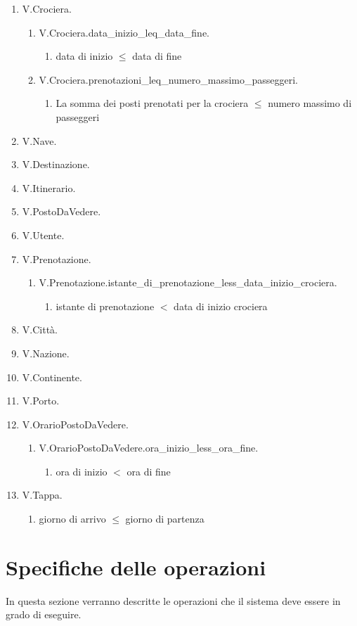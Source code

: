 \documentclass{article}
\begin{document}
\begin{enumerate}
    \item V.Crociera.
    \begin{enumerate}
        \item V.Crociera.data\_inizio\_leq\_data\_fine.
        \begin{enumerate}
            \item data di inizio $\leq$ data di fine
        \end{enumerate}
        \item V.Crociera.prenotazioni\_leq\_numero\_massimo\_passeggeri.
        \begin{enumerate}
            \item La somma dei posti prenotati per la crociera $\leq$ numero massimo di passeggeri
        \end{enumerate}
    \end{enumerate}
    \item V.Nave.
    \item V.Destinazione.
    \item V.Itinerario.
    \item V.PostoDaVedere.
    \item V.Utente.
    \item V.Prenotazione.
    \begin{enumerate}
        \item V.Prenotazione.istante\_di\_prenotazione\_less\_data\_inizio\_crociera.
        \begin{enumerate}
            \item istante di prenotazione $<$ data di inizio crociera
        \end{enumerate}
    \end{enumerate}
    \item V.Città.
    \item V.Nazione.
    \item V.Continente.
    \item V.Porto.
    \item V.OrarioPostoDaVedere.
    \begin{enumerate}
        \item V.OrarioPostoDaVedere.ora\_inizio\_less\_ora\_fine.
        \begin{enumerate}
            \item ora di inizio $<$ ora di fine
        \end{enumerate}
    \end{enumerate}
    \item V.Tappa.
    \begin{enumerate}
        \item giorno di arrivo $\leq$ giorno di partenza
    \end{enumerate}
\end{enumerate}



\section{Specifiche delle operazioni}

In questa sezione verranno descritte le operazioni che il sistema deve essere in grado di eseguire.
\end{document}

